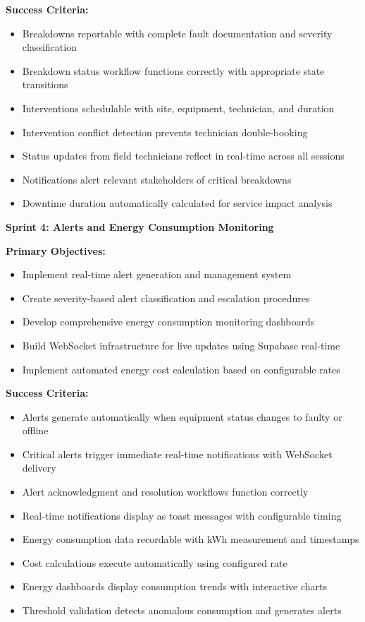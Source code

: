 \textbf{Success Criteria:}
\begin{itemize}
\item Breakdowns reportable with complete fault documentation and severity classification
\item Breakdown status workflow functions correctly with appropriate state transitions
\item Interventions schedulable with site, equipment, technician, and duration
\item Intervention conflict detection prevents technician double-booking
\item Status updates from field technicians reflect in real-time across all sessions
\item Notifications alert relevant stakeholders of critical breakdowns
\item Downtime duration automatically calculated for service impact analysis
\end{itemize}

\vspace{0.3cm}

\textbf{Sprint 4: Alerts and Energy Consumption Monitoring}

\textbf{Primary Objectives:}
\begin{itemize}
\item Implement real-time alert generation and management system
\item Create severity-based alert classification and escalation procedures
\item Develop comprehensive energy consumption monitoring dashboards
\item Build WebSocket infrastructure for live updates using Supabase real-time
\item Implement automated energy cost calculation based on configurable rates
\end{itemize}

\textbf{Success Criteria:}
\begin{itemize}
\item Alerts generate automatically when equipment status changes to faulty or offline
\item Critical alerts trigger immediate real-time notifications with WebSocket delivery
\item Alert acknowledgment and resolution workflows function correctly
\item Real-time notifications display as toast messages with configurable timing
\item Energy consumption data recordable with kWh measurement and timestamps
\item Cost calculations execute automatically using configured rate
\item Energy dashboards display consumption trends with interactive charts
\item Threshold validation detects anomalous consumption and generates alerts
\end{itemize}


